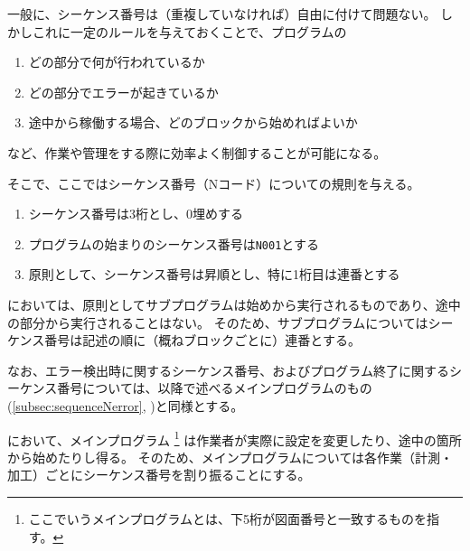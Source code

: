 


一般に、シーケンス番号は（重複していなければ）自由に付けて問題ない。
しかしこれに一定のルールを与えておくことで、プログラムの
\begin{enumerate}
\item どの部分で何が行われているか
\item どの部分でエラーが起きているか
\item 途中から稼働する場合、どのブロックから始めればよいか
\end{enumerate}
など、作業や管理をする際に効率よく制御することが可能になる。

そこで、ここではシーケンス番号（Nコード）についての規則を与える。



\begin{enumerate}[label=\Roman*), ref=\Roman*)]
\item シーケンス番号は3桁とし、0埋めする
\item プログラムの始まりのシーケンス番号は\verb|N001|とする
\item 原則として、シーケンス番号は昇順とし、特に1桁目は連番とする
\end{enumerate}


\DMname においては、原則としてサブプログラムは始めから実行されるものであり、途中の部分から実行されることはない。
そのため、サブプログラムについてはシーケンス番号は記述の順に（概ねブロックごとに）連番とする。

なお、エラー検出時に関するシーケンス番号、およびプログラム終了に関するシーケンス番号については、以降で述べるメインプログラムのもの(\autoref{subsec:sequenceNerror}, )と同様とする。



\clearpage
\DMname において、メインプログラム
\footnote{ここでいうメインプログラムとは、下5桁が図面番号と一致するものを指す。}
は作業者が実際に設定を変更したり、途中の箇所から始めたりし得る。
そのため、メインプログラムについては各作業（計測・加工）ごとにシーケンス番号を割り振ることにする。


